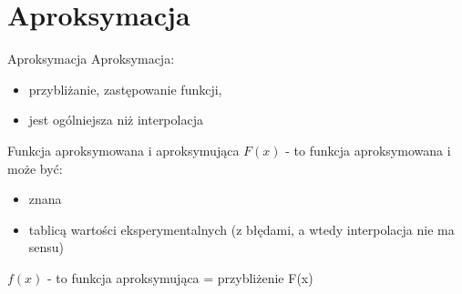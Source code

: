 

\subtitle{5. Aproksymacja}

  	\maketitle
	\section{Aproksymacja}
    \begin{frame}{Aproksymacja}
        Aproksymacja:
		\begin{itemize}
            \item przybliżanie, zastępowanie funkcji,
            \item jest ogólniejsza niż interpolacja
        \end{itemize}
    \end{frame}
    \begin{frame}{Funkcja aproksymowana i aproksymująca}
        $F(x)$ - to funkcja aproksymowana i może być:
        \begin{itemize}
          \item znana
          \item tablicą wartości eksperymentalnych (z błędami, a wtedy interpolacja nie ma sensu)
        \end{itemize}
        \hfill \break
        $f(x)$ - to funkcja aproksymująca = przybliżenie F(x)
	\end{frame}
	
    
    
    
    

